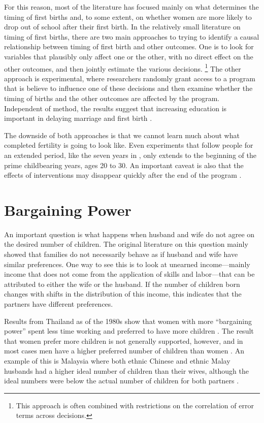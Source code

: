 \documentclass[letterpaper,12pt]{article}
\begin{document}
For this reason, most of the literature has focused mainly on what
determines the timing of first births and, to some extent, on whether
women are more likely to drop out of school after their first birth.
In the relatively small literature on timing of first births, there are
two main approaches to trying to identify a causal relationship between
timing of first birth and other outcomes.
One is to look for variables that plausibly only affect one or the
other, with no direct effect on the other outcomes, and then jointly
estimate the various decisions.%
\footnote{
This approach is often combined with restrictions on the correlation of
error terms across decisions.
} 
The other approach is experimental, where researchers randomly grant 
access to a program that is believe to influence one of these decisions 
and then examine whether the timing of births and the other outcomes 
are affected by the program.
Independent of method, the results suggest that increasing education is
important in delaying marriage and first birth
\citep{Duflo2015,Marchetta2016}. 

The downside of both approaches is that we cannot learn much about what
completed fertility is going to look like.
Even experiments that follow people for an extended period, like the
seven years in \citet{Duflo2015}, only extends to the beginning of the
prime childbearing years, ages 20 to 30.
An important caveat is also that the effects of interventions may disappear 
quickly after the end of the program \citep{Baird2016}.



\section{Bargaining Power}

An important question is what happens when husband and wife do not agree
on the desired number of children.
The original literature on this question mainly showed that families do
not necessarily behave as if husband and wife have similar preferences.
One way to see this is to look at unearned income---mainly income that 
does not come from the application of skills and labor---that can be
attributed to either the wife or the husband.
If the number of children born changes with shifts in the distribution
of this income, this indicates that the partners have different
preferences.

Results from Thailand as of the 1980s show that women with more
``bargaining power'' spent less time working and preferred to have more
children \citep{Schultz1990}.
The result that women prefer more children is not generally supported,
however, and in most cases men have a higher preferred number of
children than women \citep{Westoff2010}.
An example of this is Malaysia where both ethnic Chinese and ethnic
Malay husbands had a higher ideal number of children than their wives,
although the ideal numbers were below the actual number of children for
both partners \citep{Rasul2008}.
\end{document}
